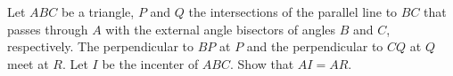 Let $ABC$ be a triangle, $P$ and $Q$ the intersections of the parallel line to $BC$ that passes through $A$ with the external angle bisectors of angles $B$ and $C$,  respectively. The perpendicular to $BP$ at $P$ and the perpendicular to $CQ$ at $Q$ meet at $R$. Let $I$ be the incenter of $ABC$. Show that $AI  = AR$.
